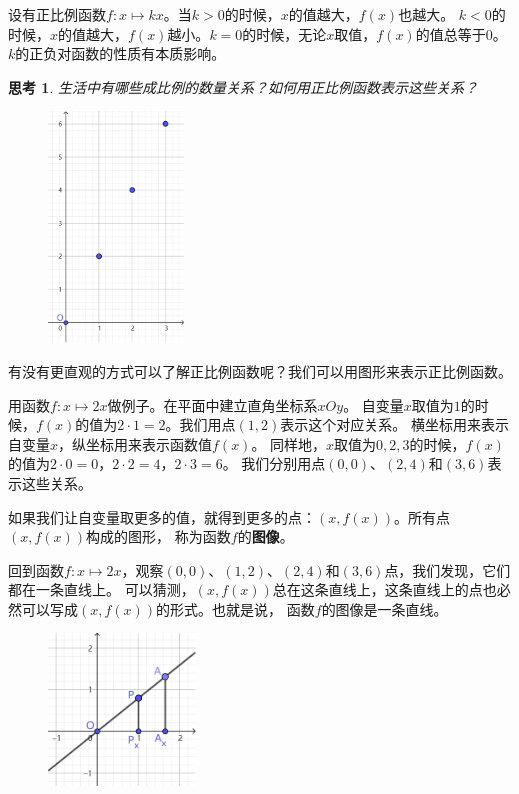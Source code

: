 \documentclass[12pt,UTF8]{ctexbook}
\newtheorem{sk}{思考}[section]
\begin{document}
设有正比例函数$f: x\mapsto kx$。当$k>0$的时候，$x$的值越大，$f(x)$也越大。
$k<0$的时候，$x$的值越大，$f(x)$越小。$k=0$的时候，无论$x$取值，$f(x)$的值总等于$0$。
$k$的正负对函数的性质有本质影响。

\begin{sk}\label{sk:5-0-0}
    生活中有哪些成比例的数量关系？如何用正比例函数表示这些关系？
\end{sk}

\begin{figure} %
    \vspace{-10pt}
    \flushright
    \includegraphics[width=0.32\textwidth]{tu/正比例0.png}
\end{figure}

有没有更直观的方式可以了解正比例函数呢？我们可以用图形来表示正比例函数。

用函数$f: x \mapsto 2x$做例子。在平面中建立直角坐标系$xOy$。
自变量$x$取值为$1$的时候，$f(x)$的值为$2\cdot 1 = 2$。我们用点$(1, 2)$表示这个对应关系。
横坐标用来表示自变量$x$，纵坐标用来表示函数值$f(x)$。
同样地，$x$取值为$0,2,3$的时候，$f(x)$的值为$2\cdot 0 = 0$，$2\cdot 2 = 4$，$2\cdot 3 = 6$。
我们分别用点$(0,0)$、$(2,4)$和$(3,6)$表示这些关系。

如果我们让自变量取更多的值，就得到更多的点：$(x, f(x))$。所有点$(x, f(x))$构成的图形，
称为函数$f$的\textbf{图像}。

回到函数$f: x \mapsto 2x$，观察$(0, 0)$、$(1, 2)$、$(2,4)$和$(3,6)$点，我们发现，它们都在一条直线上。
可以猜测，$(x, f(x))$总在这条直线上，这条直线上的点也必然可以写成$(x, f(x))$的形式。也就是说，
函数$f$的图像是一条直线。

\begin{figure} %
    \vspace{-10pt}
    \flushright
    \includegraphics[width=0.35\textwidth]{tu/正比例1.png}
\end{figure}
\end{document}
